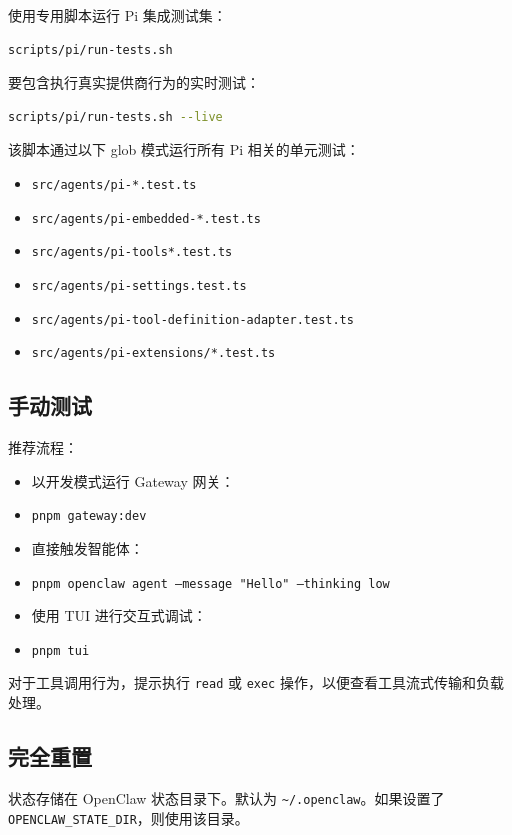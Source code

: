 使用专用脚本运行 Pi 集成测试集：

\begin{lstlisting}[language=bash]
scripts/pi/run-tests.sh
\end{lstlisting}


要包含执行真实提供商行为的实时测试：

\begin{lstlisting}[language=bash]
scripts/pi/run-tests.sh --live
\end{lstlisting}


该脚本通过以下 glob 模式运行所有 Pi 相关的单元测试：

\begin{itemize}
  \item \texttt{src/agents/pi-*.test.ts}
  \item \texttt{src/agents/pi-embedded-*.test.ts}
  \item \texttt{src/agents/pi-tools*.test.ts}
  \item \texttt{src/agents/pi-settings.test.ts}
  \item \texttt{src/agents/pi-tool-definition-adapter.test.ts}
  \item \texttt{src/agents/pi-extensions/*.test.ts}
\end{itemize}


\subsection{手动测试}


推荐流程：

\begin{itemize}
  \item 以开发模式运行 Gateway 网关：
  \item \texttt{pnpm gateway:dev}
  \item 直接触发智能体：
  \item \texttt{pnpm openclaw agent --message "Hello" --thinking low}
  \item 使用 TUI 进行交互式调试：
  \item \texttt{pnpm tui}
\end{itemize}


对于工具调用行为，提示执行 \texttt{read} 或 \texttt{exec} 操作，以便查看工具流式传输和负载处理。

\subsection{完全重置}


状态存储在 OpenClaw 状态目录下。默认为 \texttt{\textasciitilde{}/.openclaw}。如果设置了 \texttt{OPENCLAW\_STATE\_DIR}，则使用该目录。

